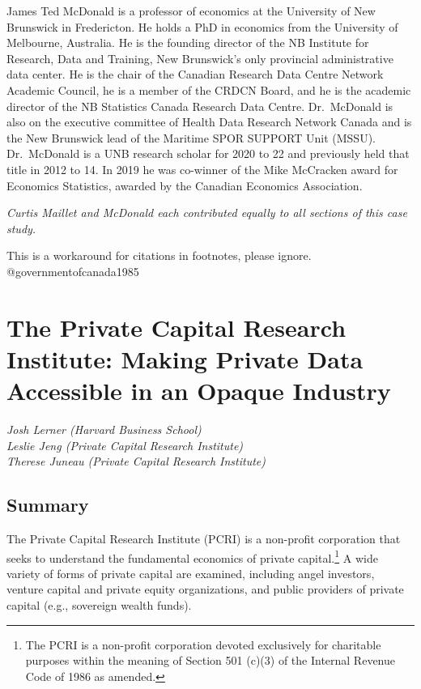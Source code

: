 \documentclass[
]{book}
\begin{document}
James Ted McDonald is a professor of economics at the University of New Brunswick in Fredericton. He holds a PhD in economics from the University of Melbourne, Australia. He is the founding director of the NB Institute for Research, Data and Training, New Brunswick's only provincial administrative data center. He is the chair of the Canadian Research Data Centre Network Academic Council, he is a member of the CRDCN Board, and he is the academic director of the NB Statistics Canada Research Data Centre. Dr.~McDonald is also on the executive committee of Health Data Research Network Canada and is the New Brunswick lead of the Maritime SPOR SUPPORT Unit (MSSU). Dr.~McDonald is a UNB research scholar for 2020 to 22 and previously held that title in 2012 to 14. In 2019 he was co-winner of the Mike McCracken award for Economics Statistics, awarded by the Canadian Economics Association.

\emph{Curtis Maillet and McDonald each contributed equally to all sections of this case study.}

\begin{invisible}
This is a workaround for citations in footnotes, please ignore.
@governmentofcanada1985
\end{invisible}

\hypertarget{pcri}{%
\chapter{The Private Capital Research Institute: Making Private Data Accessible in an Opaque Industry}\label{pcri}}

\emph{Josh Lerner (Harvard Business School)}\\
\emph{Leslie Jeng (Private Capital Research Institute)}\\
\emph{Therese Juneau (Private Capital Research Institute)}

\hypertarget{summary-4}{%
\section{Summary}\label{summary-4}}

The Private Capital Research Institute (PCRI) is a non-profit corporation that seeks to understand the fundamental economics of private capital.\footnote{The PCRI is a non-profit corporation devoted exclusively for charitable purposes within the meaning of Section 501 (c)(3) of the Internal Revenue Code of 1986 as amended.} A wide variety of forms of private capital are examined, including angel investors, venture capital and private equity organizations, and public providers of private capital (e.g., sovereign wealth funds).
\end{document}
